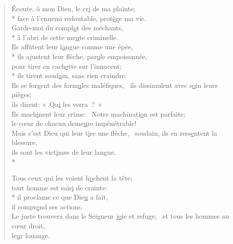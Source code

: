 
\begin{verse}
Écoute, ô mon Dieu, le cr\underline{i} de ma plainte; \\*
face à l’ennemi redoutable, prot\underline{è}ge ma vie. \\
Garde-moi du compl\underline{o}t des méchants, \\*
à l’abri de cette me\underline{u}te criminelle. \\

Ils affûtent leur l\underline{a}ngue comme une épée, \\*
ils ajustent leur flèche, par\underline{o}le empoisonnée, \\
pour tirer en cach\underline{e}tte sur l’innocent; \\*
ils tirent soud\underline{a}in, sans rien craindre. \\

Ils se forgent des form\underline{u}les maléfiques,~\psalmdagger
ils dissimulent avec s\underline{o}in leurs pièges; \\
ils disent: « Qu\underline{i} les verra ? » \\

Ils mach\underline{i}nent leur crime:~\psalmdagger
Notre machinati\underline{o}n est parfaite; \\
le cœur de chacun deme\underline{u}re impénétrable! \\

Mais c’est Dieu qui leur t\underline{i}re une flèche,~\psalmdagger
soudain, ils en ress\underline{e}ntent la blessure, \\
ils sont les vict\underline{i}mes de leur langue. \\*

Tous ceux qui les voient h\underline{o}chent la tête; \\
tout homme est sais\underline{i} de crainte: \\*
il proclame ce que Die\underline{u} a fait, \\
il compr\underline{e}nd ses actions. \\

Le juste trouvera dans le Seigneur
j\underline{o}ie et refuge,~\psalmstar
et tous les hommes au cœur droit, \\
le\underline{u}r louange. \\
\end{verse}

